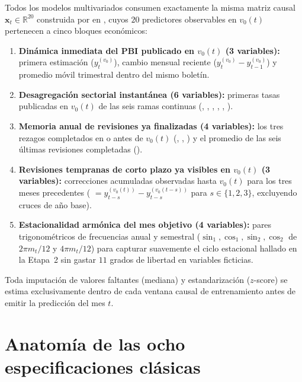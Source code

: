 \documentclass[12pt,letterpaper]{article}
\begin{document}
Todos los modelos multivariados consumen exactamente la misma matriz causal \(\mathbf{x}_t \in \mathbb{R}^{20}\) construida por  en , cuyos \(20\) predictores observables en \(v_0(t)\) pertenecen a cinco bloques económicos:
\begin{enumerate}
  \item \textbf{Dinámica inmediata del PBI publicado en \(v_0(t)\) (3 variables):} primera estimación  (\(y_t^{(v_0)}\)), cambio mensual reciente  (\(y_t^{(v_0)} - y_{t-1}^{(v_0)}\)) y promedio móvil trimestral  dentro del mismo boletín.
  \item \textbf{Desagregación sectorial instantánea (6 variables):} primeras tasas publicadas en \(v_0(t)\) de las seis ramas continuas (, , , , , ).
  \item \textbf{Memoria anual de revisiones ya finalizadas (4 variables):} los tres rezagos completados en o antes de \(v_0(t)\) (, , ) y el promedio de las seis últimas revisiones completadas ().
  \item \textbf{Revisiones tempranas de corto plazo ya visibles en \(v_0(t)\) (3 variables):} correcciones acumuladas observadas hasta \(v_0(t)\) para los tres meses precedentes ( \(= y_{t-s}^{(v_0(t))} - y_{t-s}^{(v_0(t-s))}\) para \(s \in \{1, 2, 3\}\), excluyendo cruces de año base).
  \item \textbf{Estacionalidad armónica del mes objetivo (4 variables):} pares trigonométricos de frecuencias anual y semestral (\(\sin_1, \cos_1, \sin_2, \cos_2\) de \(2\pi m_t / 12\) y \(4\pi m_t / 12\)) para capturar suavemente el ciclo estacional hallado en la Etapa~2 sin gastar \(11\) grados de libertad en variables ficticias.
\end{enumerate}

Toda imputación de valores faltantes (mediana) y estandarización (\(z\)-score) se estima exclusivamente dentro de cada ventana causal de entrenamiento antes de emitir la predicción del mes \(t\).

\section{Anatomía de las ocho especificaciones clásicas}
\end{document}
